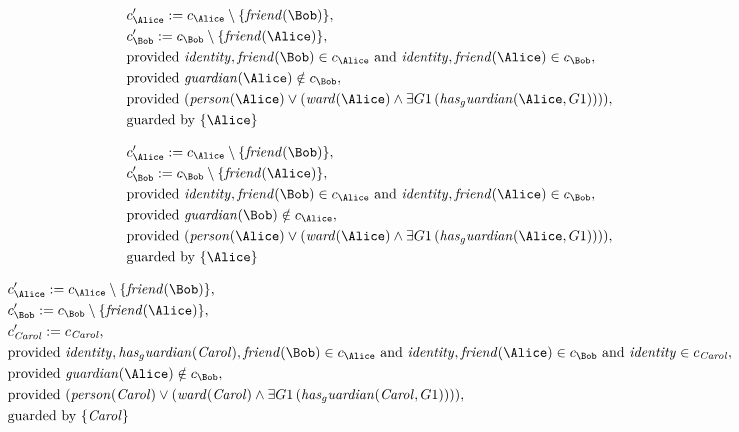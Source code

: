 \begin{align*}
&
c'_
{
\Alice
}
 := 
c_
{
\Alice
}
 \setminus 
\{
\mathit{
friend
}
(
\Bob
)
\}
,\\
&
c'_
{
\Bob
}
 := 
c_
{
\Bob
}
 \setminus 
\{
\mathit{
friend
}
(
\Alice
)
\}
,\\
&
\text{provided } 
\mathit{
identity
}
,
\mathit{
friend
}
(
\Bob
)
 \in c_
{
\Alice
}
 \text{ and } 
\mathit{
identity
}
,
\mathit{
friend
}
(
\Alice
)
 \in c_
{
\Bob
}
,\\
&
\text{provided } 
\mathit{
guardian
}
(
\Alice
)
 \notin c_
{
\Bob
}
,\\
&
\text{provided } 
(
\mathit{
person
}
(
\Alice
)
\lor
(
\mathit{
ward
}
(
\Alice
)
\land
\exists 
G1
\,(
\mathit{
has_guardian
}
(
\Alice
,
G1
)
)
)
)
,\\
&
\text{guarded by } \{
\Alice
\}
\end{align*}

\begin{align*}
&
c'_
{
\Alice
}
 := 
c_
{
\Alice
}
 \setminus 
\{
\mathit{
friend
}
(
\Bob
)
\}
,\\
&
c'_
{
\Bob
}
 := 
c_
{
\Bob
}
 \setminus 
\{
\mathit{
friend
}
(
\Alice
)
\}
,\\
&
\text{provided } 
\mathit{
identity
}
,
\mathit{
friend
}
(
\Bob
)
 \in c_
{
\Alice
}
 \text{ and } 
\mathit{
identity
}
,
\mathit{
friend
}
(
\Alice
)
 \in c_
{
\Bob
}
,\\
&
\text{provided } 
\mathit{
guardian
}
(
\Bob
)
 \notin c_
{
\Alice
}
,\\
&
\text{provided } 
(
\mathit{
person
}
(
\Alice
)
\lor
(
\mathit{
ward
}
(
\Alice
)
\land
\exists 
G1
\,(
\mathit{
has_guardian
}
(
\Alice
,
G1
)
)
)
)
,\\
&
\text{guarded by } \{
\Alice
\}
\end{align*}

\begin{align*}
&
c'_
{
\Alice
}
 := 
c_
{
\Alice
}
 \setminus 
\{
\mathit{
friend
}
(
\Bob
)
\}
,\\
&
c'_
{
\Bob
}
 := 
c_
{
\Bob
}
 \setminus 
\{
\mathit{
friend
}
(
\Alice
)
\}
,\\
&
c'_
{
\mathit{Carol}
}
 := 
c_
{
\mathit{Carol}
}
,\\
&
\text{provided } 
\mathit{
identity
}
,
\mathit{
has_guardian
}
(
\mathit{Carol}
)
,
\mathit{
friend
}
(
\Bob
)
 \in c_
{
\Alice
}
 \text{ and } 
\mathit{
identity
}
,
\mathit{
friend
}
(
\Alice
)
 \in c_
{
\Bob
}
 \text{ and } 
\mathit{
identity
}
 \in c_
{
\mathit{Carol}
}
,\\
&
\text{provided } 
\mathit{
guardian
}
(
\Alice
)
 \notin c_
{
\Bob
}
,\\
&
\text{provided } 
(
\mathit{
person
}
(
\mathit{Carol}
)
\lor
(
\mathit{
ward
}
(
\mathit{Carol}
)
\land
\exists 
G1
\,(
\mathit{
has_guardian
}
(
\mathit{Carol}
,
G1
)
)
)
)
,\\
&
\text{guarded by } \{
\mathit{Carol}
\}
\end{align*}
